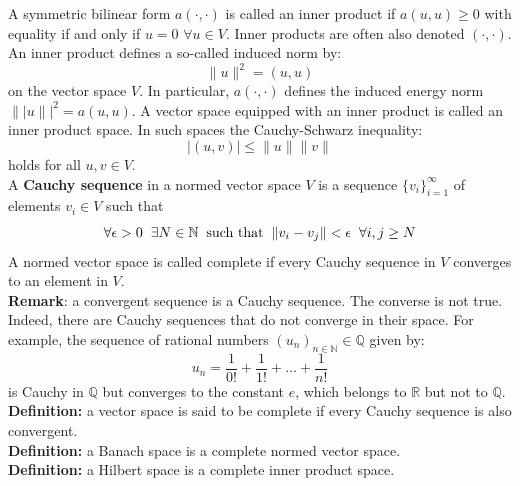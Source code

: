 A symmetric bilinear form $a(\cdot,\cdot)$ is called an inner product if $a(u,u) \geq 0$ with equality if and only if $u=0$ $\forall u \in V$. Inner products are often also denoted $(\cdot,\cdot)$. An inner product defines a so-called induced norm by:
\[
    \|u\|^2 = (u,u)    
\]
on the vector space $V$. In particular, $a(\cdot,\cdot)$ defines the induced energy norm $\||u\||^2 = a(u,u)$. A vector space equipped with an inner product is called an inner product space. In such spaces the Cauchy-Schwarz inequality:
\[
    |(u,v)| \leq \|u\|\|v\|    
\]
holds for all $u,v \in V$.\\

A \textbf{Cauchy sequence} in a normed vector space $V$ is a sequence $\{v_i\}^{\infty}_{i=1}$ of elements $v_i \in V$ such that
 \[
    \forall \epsilon > 0 \hspace{0.2cm} \exists N \in \mathbb{N} \hspace{0.2cm}\text{such that}\hspace{0.2cm} \|v_i - v_j\| < \epsilon \hspace{0.2cm}\forall i,j \geq N
\] 
A normed vector space is called complete if every Cauchy sequence in $V$ converges to an element in $V$.\\

\textbf{Remark}: a convergent sequence is a Cauchy sequence. The converse is not true. Indeed, there are Cauchy sequences that do not converge in their space. For example, the sequence of rational numbers $(u_n)_{n \in \mathbb{N}} \in \mathbb{Q}$ given by:
\[
    u_n = \dfrac{1}{0!} + \dfrac{1}{1!} + \dots + \dfrac{1}{n!}    
\]
is Cauchy in $\mathbb{Q}$ but converges to the constant $e$, which belongs to $\mathbb{R}$ but not to $\mathbb{Q}$.\\

\textbf{Definition:} a vector space is said to be complete if every Cauchy sequence is also convergent.\\

\textbf{Definition:} a Banach space is a complete normed vector space.\\

\textbf{Definition:} a Hilbert space is a complete inner product space.\\

